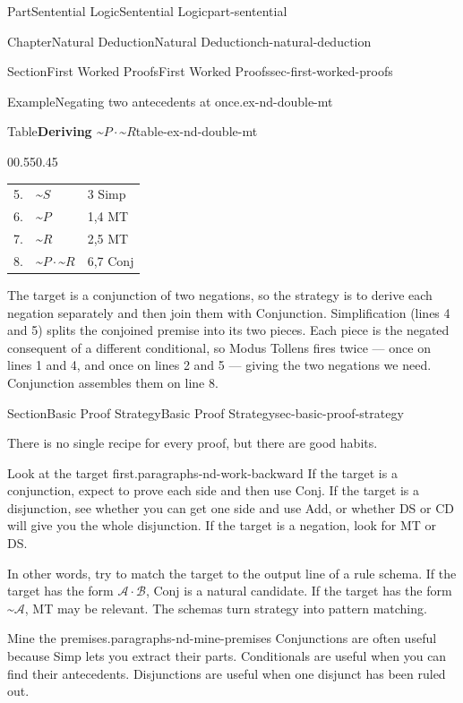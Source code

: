 \documentclass[oneside,10pt,]{book}
\begin{document}
\begin{partptx}{Part}{Sentential Logic}{}{Sentential Logic}{}{}{part-sentential}
\begin{chapterptx}{Chapter}{Natural Deduction}{}{Natural Deduction}{}{}{ch-natural-deduction}
\begin{sectionptx}{Section}{First Worked Proofs}{}{First Worked Proofs}{}{}{sec-first-worked-proofs}
\begin{example}{Example}{Negating two antecedents at once.}{ex-nd-double-mt}
\begin{tableptx}{Table}{\textbf{Deriving \({\text{\textasciitilde}}P \cdot {\text{\textasciitilde}}R\)}}{table-ex-nd-double-mt}{}
\begin{tabularbox}{0}{0.55}{0.45}
{{\begin{tabular}{lll}
5.&\({\text{\textasciitilde}}S\)&3 Simp\tabularnewline[0pt]
6.&\({\text{\textasciitilde}}P\)&1,4 MT\tabularnewline[0pt]
7.&\({\text{\textasciitilde}}R\)&2,5 MT\tabularnewline[0pt]
8.&\({\text{\textasciitilde}}P \cdot {\text{\textasciitilde}}R\)&6,7 Conj
\end{tabular}
}%
}%
\end{tabularbox}%
\end{tableptx}%
\end{example}
The target is a conjunction of two negations, so the strategy is to derive each negation separately and then join them with Conjunction. Simplification (lines 4 and 5) splits the conjoined premise into its two pieces. Each piece is the negated consequent of a different conditional, so Modus Tollens fires twice — once on lines 1 and 4, and once on lines 2 and 5 — giving the two negations we need. Conjunction assembles them on line 8.%
\end{sectionptx}
%
%
\typeout{************************************************}
\typeout{************************************************}
%
\begin{sectionptx}{Section}{Basic Proof Strategy}{}{Basic Proof Strategy}{}{}{sec-basic-proof-strategy}
\begin{introduction}{}%
There is no single recipe for every proof, but there are good habits.%
\end{introduction}%
\begin{paragraphs}{Look at the target first.}{paragraphs-nd-work-backward}%
If the target is a conjunction, expect to prove each side and then use Conj. If the target is a disjunction, see whether you can get one side and use Add, or whether DS or CD will give you the whole disjunction. If the target is a negation, look for MT or DS.%
\par
In other words, try to match the target to the output line of a rule schema. If the target has the form \(\mathcal{A} \cdot \mathcal{B}\), Conj is a natural candidate. If the target has the form \({\text{\textasciitilde}}\mathcal{A}\), MT may be relevant. The schemas turn strategy into pattern matching.%
\end{paragraphs}%
\begin{paragraphs}{Mine the premises.}{paragraphs-nd-mine-premises}%
Conjunctions are often useful because Simp lets you extract their parts. Conditionals are useful when you can find their antecedents. Disjunctions are useful when one disjunct has been ruled out.%

\end{paragraphs}
\end{sectionptx}
\end{chapterptx}
\end{partptx}
\end{document}
